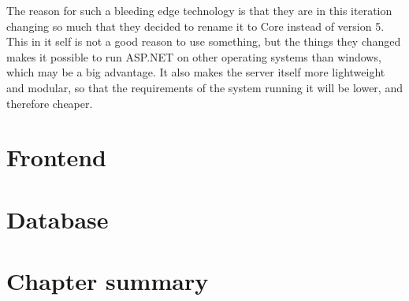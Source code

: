 The reason for such a bleeding edge technology is that they are in this iteration changing so much that they decided to rename it to Core instead of version 5. This in it self is not a good reason to use something, but the things they changed makes it possible to run ASP.NET on other operating systems than windows\cite{asp5:intro}, which may be a big advantage. It also makes the server itself more lightweight and modular, so that the requirements of the system running it will be lower, and therefore cheaper.

\section{Frontend}
\label{sec:Frontend}


\section{Database }
\label{sec:Database_engine}


\section{Chapter summary }
